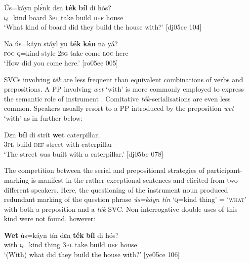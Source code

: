 \ea%
    \label{ex:key:1568}
    \gll \'{U}s=káyn  plɛ́nk  dɛn  \textbf{ték}    \textbf{bíl}    di  hós?\\
\textsc{q}=kind  board  \textsc{3pl}  take    build  \textsc{def}  house\\

\glt ‘What kind of board did they build the house with?’ [dj05ce 104]
\z


\ea%
    \label{ex:key:1569}
    \gll Na  ús=káyn  stáyl  yu  \textbf{ték}    \textbf{kán}    na  yá?\\
\textsc{foc}  \textsc{q}=kind  style  \textsc{2sg}  take    come  \textsc{loc}  here\\

\glt ‘How did you come here.’ [ro05ee 005]
\z

SVCs involving \textit{ték} are less frequent than equivalent combinations of verbs and prepositions. A PP involving \textit{wet} ‘with’ is more commonly employed to express the semantic role of instrument\index{} . Comitative \textit{ték}{}-serialisations are even less common. Speakers usually resort to a PP introduced by the preposition \textit{wet} ‘with’ as in  further below: 


\ea%
    \label{ex:key:1570}
    \gll Dɛn  \textbf{bíl}   di  strít    \textbf{wet}    caterpillar.\\
\textsc{3pl}  build  \textsc{def}  street  with    caterpillar\\

\glt ‘The street was built with a caterpillar.’ [dj05be 078]
\z

The competition between the serial and prepositional strategies of participant-marking is manifest in the rather exceptional sentences  and  elicited from two different speakers. Here, the questioning of the instrument noun produced redundant marking of the question phrase \textit{ús=káyn tín} ‘\textsc{q}=kind thing’ = ‘\textsc{what’} with both a preposition and a \textit{ték}{}-SVC. Non-interrogative double uses of this kind were not found, however:


\ea%
    \label{ex:key:1571}
    \gll \textbf{Wet}    ús=káyn  tín    dɛn  \textbf{ték}  \textbf{bíl}   di  hós?\\
with    \textsc{q}=kind  thing  \textsc{3pl}  take  build  \textsc{def}  house\\

\glt ‘(With) what did they build the house with?’ [ye05ce 106]
\z



